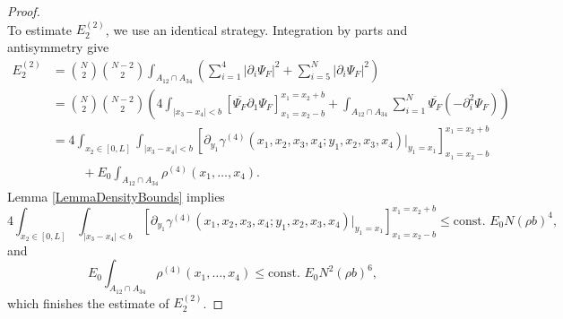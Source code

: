 \documentclass[a4paper,11pt]{article}
\newcommand{\abs}[1]{\left\lvert #1 \right\rvert}
\numberwithin{equation}{section}
\begin{document}
\begin{proof}
\begin{equation}
		\end{equation}
		To estimate $ E_2^{(2)} $, we use an identical strategy. Integration by parts and antisymmetry give  \begin{equation}
			\begin{aligned}
				E_2^{(2)}&=\binom{N}{2}\binom{N-2}{2}\int_{A_{12}\cap A_{34}} \left(\sum_{i=1}^{4}\abs{\partial_i\Psi_F}^2+\sum_{i=5}^{N}\abs{\partial_i\Psi_F}^2\right)\\
				&=\binom{N}{2}\binom{N-2}{2}\left(4\int_{\abs{x_3-x_4}<b}\left[\overline{\Psi_F}\partial_1\Psi_F\right]_{x_1=x_2-b}^{x_1=x_2+b} +\int_{A_{12}\cap A_{34}} \sum_{i=1}^{N}\overline{\Psi_F}(-\partial^2_i\Psi_F)\right)\\
				&=4\int_{x_2\in[0,L]}\int_{\abs{x_3-x_4}<b}\left[\partial_{y_1}\gamma^{(4)}(x_1,x_2,x_3,x_4;y_1,x_2,x_3,x_4)\bigg\vert_{y_1=x_1}\right]_{x_1=x_2-b}^{x_1=x_2+b}\\&\hspace{1cm}+E_0\int_{A_{12}\cap A_{34}}\rho^{(4)}(x_1,\dots,x_4).
			\end{aligned}
		\end{equation}
		Lemma \ref{LemmaDensityBounds} implies \begin{equation}
			4\int_{x_2\in[0,L]}\int_{\abs{x_3-x_4}<b}\left[\partial_{y_1}\gamma^{(4)}(x_1,x_2,x_3,x_4;y_1,x_2,x_3,x_4)\bigg\vert_{y_1=x_1}\right]_{x_1=x_2-b}^{x_1=x_2+b}\leq\text{const. }E_0 N (\rho b)^4,
		\end{equation}
		and\begin{equation}
			E_0\int_{A_{12}\cap A_{34}}\rho^{(4)}(x_1,\dots,x_4)\leq \text{const. } E_0 N^2(\rho b)^6,
		\end{equation}
		which finishes the estimate of $E^{(2)}_2$.
	\end{proof}
	
\end{document}
